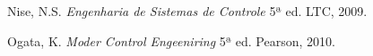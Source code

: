 \documentclass[a4paper,11pt]{article}
\begin{document}
\begin{thebibliography}{9}    
  		Nise, N.S.
  		\emph{Engenharia de Sistemas de Controle}
 		 5ª ed.
		LTC, 2009.

  		Ogata, K.
  		\emph{Moder Control Engeeniring}
 		 5ª ed.
		Pearson, 2010.
	 
\end{thebibliography}
\end{document}
